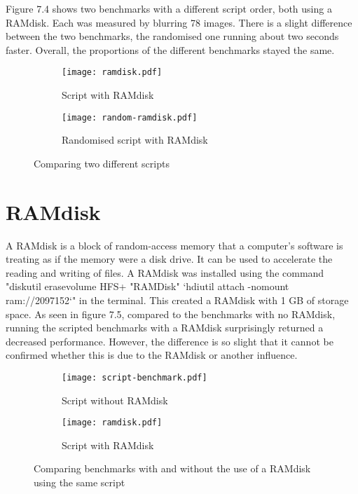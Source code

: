 Figure 7.4 shows two benchmarks with a different script order, both using a RAMdisk. Each was measured by blurring 78 images. There is a slight difference between the two benchmarks, the randomised one running about two seconds faster. Overall, the proportions of the different benchmarks stayed the same.

\begin{figure}[H]
	\centering
	\begin{subfigure}{.5\textwidth}
	  \centering
	  \texttt{[image: ramdisk.pdf]}
	  \caption{Script with RAMdisk}
	  \label{fig:ramdisk}
	\end{subfigure}%
	\begin{subfigure}{.5\textwidth}
	  \centering
	  \texttt{[image: random-ramdisk.pdf]}
	  \caption{Randomised script with RAMdisk}
	  \label{fig:random-ramdisk}
	\end{subfigure}
	\caption{Comparing two different scripts}
	\label{fig:two-scripts}
\end{figure}

\section{RAMdisk}
A RAMdisk is a block of random-access memory that a computer's software is treating as if the memory were a disk drive. It can be used to accelerate the reading and writing of files. A RAMdisk was installed using the command "diskutil erasevolume HFS+ "RAMDisk" `hdiutil attach -nomount ram://2097152`" in the terminal. This created a RAMdisk with 1 GB of storage space.
As seen in figure 7.5, compared to the benchmarks with no RAMdisk, running the scripted benchmarks with a RAMdisk surprisingly returned a decreased performance. However, the difference is so slight that it cannot be confirmed whether this is due to the RAMdisk or another influence.

\begin{figure}[H]
	\centering
	\begin{subfigure}{.5\textwidth}
	  \centering
	  \texttt{[image: script-benchmark.pdf]}
	  \caption{Script without RAMdisk}
	  \label{fig:script2}
	\end{subfigure}%
	\begin{subfigure}{.5\textwidth}
	  \centering
	  \texttt{[image: ramdisk.pdf]}
	  \caption{Script with RAMdisk}
	  \label{fig:ramdisk2}
	\end{subfigure}
	\caption{Comparing benchmarks with and without the use of a RAMdisk using the same script}
	\label{fig:ramdisk-vs-noramdisk}
\end{figure}

